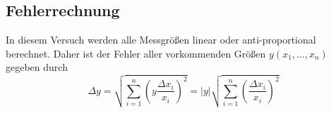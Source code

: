 \label{anhang}

\subsection{Fehlerrechnung}
In diesem Versuch werden alle Messgrößen linear oder anti-proportional berechnet. Daher ist der Fehler aller vorkommenden Größen $ y(x_1, \dots, x_n) $ gegeben durch
\begin{equation}
	\Delta y = \sqrt{\sum_{i=1}^{n}\left(y\frac{\Delta x_i}{x_i}\right)^2} 
		= |y|\sqrt{\sum_{i=1}^{n}\left(\frac{\Delta x_i}{x_i}\right)^2}  \label{eq:err}
\end{equation}

%
%

